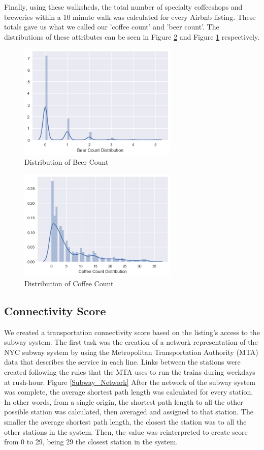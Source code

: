 \documentclass[conference]{IEEEtran}
\begin{document}
Finally, using these walksheds, the total number of specialty coffeeshops and breweries within
a 10 minute walk was calculated for every Airbnb listing. These totals gave us what we called
our 'coffee count' and 'beer count'. The distributions of these attributes can be seen in
Figure \ref{fig_coffee_count} and Figure \ref{fig_beer_count} respectively.

\begin{figure}[H]
\centering
\includegraphics[width=3in]{beer_count}
\caption{Distribution of Beer Count}
\label{fig_beer_count}
\end{figure}

\begin{figure}[H]
\centering
\includegraphics[width=3in]{coffee_count}
\caption{Distribution of Coffee Count}
\label{fig_coffee_count}
\end{figure}

\subsection{Connectivity Score}
We created a transportation connectivity score based on the listing's access to the subway system. The first task was the creation of a network representation of the NYC subway system by using the Metropolitan Transportation Authority (MTA) data that describes the service in each line. Links between the stations were created following the rules that the MTA uses to run the trains during weekdays at rush-hour. Figure \ref{Subway_Network} After the network of the subway system was complete, the average shortest path length was calculated for every station. In other words, from a single origin, the shortest path length to all the other possible station was calculated, then averaged and assigned to that station. The smaller the average shortest path length, the closest the station was to all the other stations in the system. Then, the value was reinterpreted to create score from 0 to 29, being 29 the closest station in the system.
\end{document}
